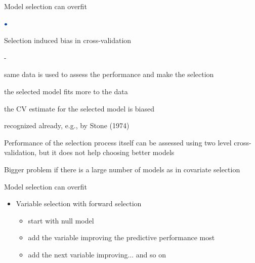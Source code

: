 \documentclass[english,t]{beamer}
\newenvironment{list1}{
   \begin{list}{$\color{list1}\bullet$}{\itemsep=6pt}}{
  \end{list}}
\newenvironment{list2}{
  \begin{list}{-}{\baselineskip=12pt\itemsep=2pt}}{
  \end{list}}
\begin{document}

\begin{frame}{Model selection can overfit}

  \begin{list1}
  \item Selection induced bias in cross-validation
    \begin{list2}
    \item same data is used to assess the performance and make the selection
    \item the selected model fits more to the data
    \item the CV estimate for the selected model is biased
    \item recognized already, e.g., by Stone (1974)
    \end{list2}
    \pause
  \item Performance of the selection process itself can be assessed
    using two level cross-validation, but it does not help choosing
    better models
    \pause
  \item Bigger problem if there is a large number of models as in
    covariate selection
  \end{list1}

\end{frame}

\begin{frame}{Model selection can overfit}

  \begin{itemize}
  \item Variable selection with forward selection
    \begin{itemize}
    \item start with null model
    \item add the variable improving the predictive performance most
    \item add the next variable improving... and so on
    \end{itemize}
  \end{itemize}

  
\end{frame}
\end{document}

